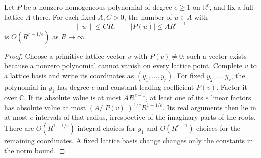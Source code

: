 \begin{lemma}
Let $P$ be a nonzero homogeneous polynomial of degree $e\ge1$
on $\mathbb R^r$, and fix a full lattice $\Lambda$ there.
For each fixed $A,C>0$, the number of $u\in\Lambda$ with
\[
       \|u\|\le CR,\qquad |P(u)|\le AR^{e-1}
\]
is $O(R^{r-1/e})$ as $R\to\infty$.
\end{lemma}
\begin{proof}
Choose a primitive lattice vector $v$ with $P(v)\ne0$;
such a vector exists because a nonzero polynomial cannot vanish
on every lattice point.  Complete $v$ to a lattice basis and
write its coordinates as $(y_1,\ldots,y_r)$.  For fixed
$y_2,\ldots,y_r$, the polynomial in $y_1$ has degree $e$
and constant leading coefficient $P(v)$.  Factor it over
$\mathbb C$.  If its absolute value is at most $AR^{e-1}$,
at least one of its $e$ linear factors has absolute value at
most $(A/|P(v)|)^{1/e}R^{1-1/e}$.  Its real arguments then
lie in at most $e$ intervals of that radius, irrespective
of the imaginary parts of the roots.  There are
$O(R^{1-1/e})$ integral choices for $y_1$ and $O(R^{r-1})$
choices for the remaining coordinates.  A fixed lattice basis
change changes only the constants in the norm bound.
\end{proof}

